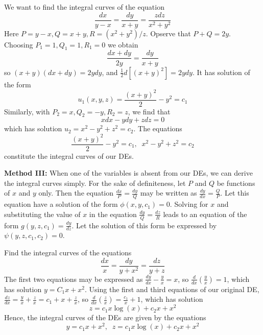 \documentclass[12pt, a4paper, oneside, openright, titlepage]{book}
\begin{document}
\begin{appendices}
    \begin{eg}
        We want to find the integral curves of the equation \begin{equation*}
            \frac{dx}{y-x} = \frac{dy}{x+y}=\frac{zdz}{x^2+y^2}
        \end{equation*}
        Here $P = y-x, Q = x+y, R = (x^2+y^2)/z$. Opserve that $P+Q = 2y$. Choosing $P_1 = 1,Q_1 = 1, R_1 = 0$ we obtain \begin{equation*}
            \frac{dx+dy}{2y} = \frac{dy}{x+y}
        \end{equation*}
        so $(x+y)(dx+dy) = 2ydy$, and $\frac{1}{2}d[(x+y)^2] = 2ydy$. It has solution of the form \begin{equation*}
            u_1(x,y,z) = \frac{(x+y)^2}{2} - y^2 = c_1
        \end{equation*}
        Similarly, with $P_2 = x,Q_2 = -y,R_2 = z$, we find that \begin{equation*}
            xdx-ydy+zdz = 0
        \end{equation*}
        which has solution $u_2 = x^2-y^2+z^2 = c_2$. The equations \begin{equation*}
            \frac{(x+y)^2}{2}-y^2=c_1,\;\;x^2-y^2+z^2 = c_2
        \end{equation*}
        constitute the integral curves of our DEs.
    \end{eg}


    \textbf{Method III:} When one of the variables is absent from our DEs, we can derive the integral curves simply. For the sake of definiteness, let $P$ and $Q$ be functions of $x$ and $y$ only. Then the equation $\frac{dx}{P} = \frac{dy}{Q}$ may be written as $\frac{dy}{dx} = \frac{Q}{P}$. Let this equation have a solution of the form $\phi(x,y,c_1) = 0$. Solving for $x$ and substituting the value of $x$ in the equation $\frac{dy}{Q} = \frac{dz}{R}$ leads to an equation of the form $g(y,z,c_1) = \frac{dy}{dz}$. Let the solution of this form be expressed by $\psi(y,z,c_1,c_2) = 0$.

    \begin{eg}
        Find the integral curves of the equations \begin{equation*}
            \frac{dx}{x} = \frac{dy}{y+x^2} = \frac{dz}{y+z}
        \end{equation*}
        The first two equations may be expressed as $\frac{dy}{dx}-\frac{y}{x} = x$, so $\frac{d}{dx}\left(\frac{y}{x}\right) = 1$, which has solution $y = C_1x+x^2$. Using the first and third equations of our original DE, $\frac{dz}{dx} = \frac{y}{x}+\frac{z}{x} =c_1+x+\frac{z}{x}$, so $\frac{d}{dx}\left(\frac{z}{x}\right) = \frac{c_1}{x}+1$, which has solution \begin{equation*}
            z = c_1x\log(x) + c_2 x + x^2
        \end{equation*}
        Hence, the integral curves of the DEs are given by the equations \begin{equation*}
            y = c_1x+x^2,\;\;z=c_1x\log(x)+c_2x+x^2
        \end{equation*}
    \end{eg}


\end{appendices}
\end{document}
